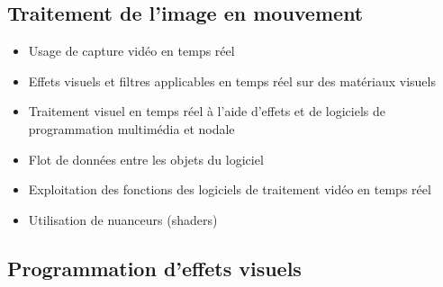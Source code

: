 \documentclass[
]{book}
\providecommand{\tightlist}{%
  \setlength{\itemsep}{0pt}\setlength{\parskip}{0pt}}
\begin{document}
\hypertarget{traitement-de-limage-en-mouvement}{%
\subsection{Traitement de l'image en mouvement}\label{traitement-de-limage-en-mouvement}}

\begin{itemize}
\tightlist
\item
  Usage de capture vidéo en temps réel\\
\item
  Effets visuels et filtres applicables en temps réel sur des matériaux visuels\\
\item
  Traitement visuel en temps réel à l'aide d'effets et de logiciels de programmation multimédia et nodale
\item
  Flot de données entre les objets du logiciel
\item
  Exploitation des fonctions des logiciels de traitement vidéo en temps réel
\item
  Utilisation de nuanceurs (shaders)
\end{itemize}

\hypertarget{programmation-deffets-visuels}{%
\subsection{Programmation d'effets visuels}\label{programmation-deffets-visuels}}
\end{document}
